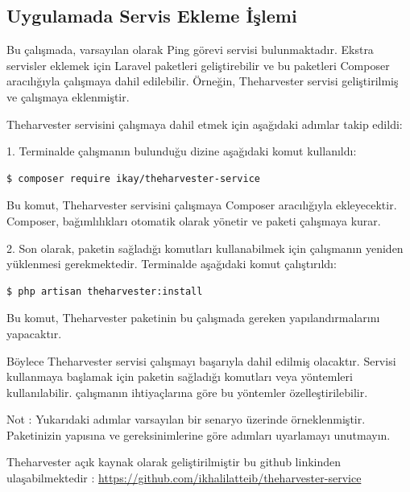 \subsection{Uygulamada Servis Ekleme İşlemi}

Bu çalışmada, varsayılan olarak Ping görevi servisi bulunmaktadır. Ekstra servisler eklemek için Laravel paketleri geliştirebilir ve bu paketleri Composer aracılığıyla çalışmaya dahil edilebilir. Örneğin, Theharvester servisi geliştirilmiş ve çalışmaya eklenmiştir.

Theharvester servisini çalışmaya dahil etmek için aşağıdaki adımlar takip edildi:

1. Terminalde çalışmanın bulunduğu dizine aşağıdaki komut kullanıldı:
\begin{lstlisting}[language=bash]
	$ composer require ikay/theharvester-service
\end{lstlisting}

Bu komut, Theharvester servisini çalışmaya Composer aracılığıyla ekleyecektir. Composer, bağımlılıkları otomatik olarak yönetir ve paketi çalışmaya kurar.

2. Son olarak, paketin sağladığı komutları kullanabilmek için çalışmanın yeniden yüklenmesi gerekmektedir. Terminalde aşağıdaki komut çalıştırıldı:
\begin{lstlisting}[language=bash]
	$ php artisan theharvester:install
\end{lstlisting}

Bu komut, Theharvester paketinin bu çalışmada gereken yapılandırmalarını yapacaktır.

Böylece Theharvester servisi çalışmayı başarıyla dahil edilmiş olacaktır. Servisi kullanmaya başlamak için paketin sağladığı komutları veya yöntemleri kullanılabilir. çalışmanın ihtiyaçlarına göre bu yöntemler özelleştirilebilir.

Not : Yukarıdaki adımlar varsayılan bir senaryo üzerinde örneklenmiştir. Paketinizin yapısına ve gereksinimlerine göre adımları uyarlamayı unutmayın.

Theharvester açık kaynak olarak geliştirilmiştir bu github linkinden ulaşabilmektedir : \href{https://github.com/ikhalilatteib/theharvester-service}{https://github.com/ikhalilatteib/theharvester-service}
